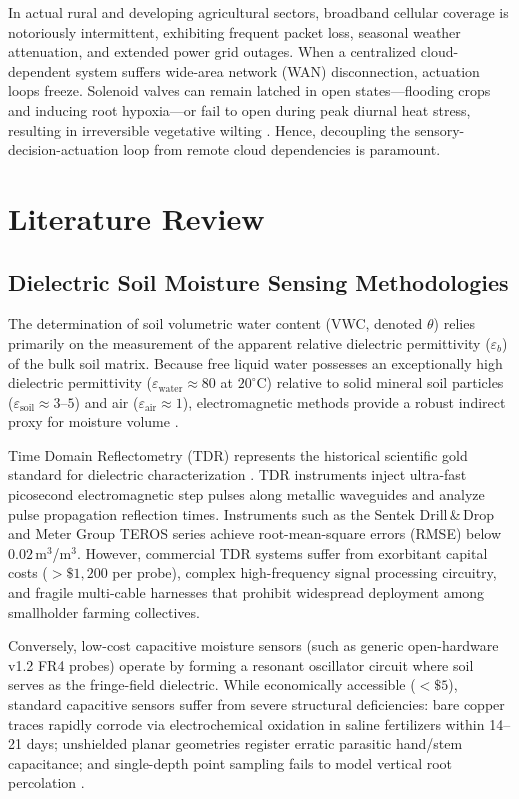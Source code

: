\documentclass[journal,10pt,twocolumn]{IEEEtran}
\begin{document}
In actual rural and developing agricultural sectors, broadband cellular coverage is notoriously intermittent, exhibiting frequent packet loss, seasonal weather attenuation, and extended power grid outages. When a centralized cloud-dependent system suffers wide-area network (WAN) disconnection, actuation loops freeze. Solenoid valves can remain latched in open states—flooding crops and inducing root hypoxia—or fail to open during peak diurnal heat stress, resulting in irreversible vegetative wilting \cite{alshahrani2021edge}. Hence, decoupling the sensory-decision-actuation loop from remote cloud dependencies is paramount.

\section{Literature Review}
\subsection{Dielectric Soil Moisture Sensing Methodologies}
The determination of soil volumetric water content (VWC, denoted $\theta$) relies primarily on the measurement of the apparent relative dielectric permittivity ($\varepsilon_b$) of the bulk soil matrix. Because free liquid water possesses an exceptionally high dielectric permittivity ($\varepsilon_{\text{water}} \approx 80$ at $20^\circ$C) relative to solid mineral soil particles ($\varepsilon_{\text{soil}} \approx 3$--$5$) and air ($\varepsilon_{\text{air}} \approx 1$), electromagnetic methods provide a robust indirect proxy for moisture volume \cite{topp1980electromagnetic}.

Time Domain Reflectometry (TDR) represents the historical scientific gold standard for dielectric characterization \cite{robinson2003review}. TDR instruments inject ultra-fast picosecond electromagnetic step pulses along metallic waveguides and analyze pulse propagation reflection times. Instruments such as the Sentek Drill\,\&\,Drop and Meter Group TEROS series achieve root-mean-square errors (RMSE) below $0.02$\,m$^3$/m$^3$. However, commercial TDR systems suffer from exorbitant capital costs ($>\$1,200$ per probe), complex high-frequency signal processing circuitry, and fragile multi-cable harnesses that prohibit widespread deployment among smallholder farming collectives.

Conversely, low-cost capacitive moisture sensors (such as generic open-hardware v1.2 FR4 probes) operate by forming a resonant oscillator circuit where soil serves as the fringe-field dielectric. While economically accessible ($<\$5$), standard capacitive sensors suffer from severe structural deficiencies: bare copper traces rapidly corrode via electrochemical oxidation in saline fertilizers within 14--21 days; unshielded planar geometries register erratic parasitic hand/stem capacitance; and single-depth point sampling fails to model vertical root percolation \cite{kizito2008frequency, lozanogarcia2020evaluation}.
\end{document}
